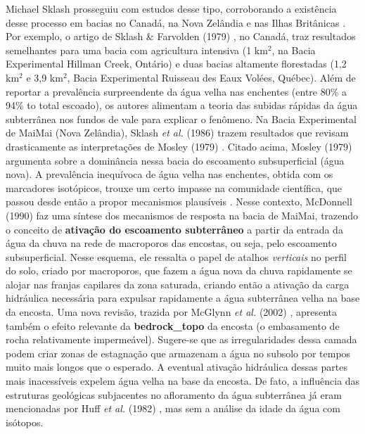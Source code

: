 \documentclass[./main.tex]{subfiles}
\begin{document}
\noindent Michael Sklash prosseguiu com estudos desse tipo, corroborando a existência desse processo em bacias no Canadá, na Nova Zelândia e nas Ilhas Britânicas \cite{sklash1979, sklash1986, sklash1996}. Por exemplo, o artigo de Sklash \& Farvolden (1979) \cite{sklash1979}, no Canadá, traz resultados semelhantes para uma bacia com agricultura intensiva (1 km$^2$, na Bacia Experimental Hillman Creek, Ontário) e duas bacias altamente florestadas (1,2 km$^2$ e 3,9 km$^2$, Bacia Experimental Ruisseau des Eaux Volées, Québec). Além de reportar a prevalência surpreendente da água velha nas enchentes (entre 80\% a 94\% to total escoado), os autores alimentam a teoria das subidas rápidas da água subterrânea nos fundos de vale para explicar o fenômeno. Na Bacia Experimental de MaiMai (Nova Zelândia), Sklash \textit{et al.} (1986) \cite{sklash1986} trazem resultados que revisam drasticamente as interpretações de Mosley (1979) \cite{Mosley1979}. Citado acima, Mosley (1979) argumenta sobre a dominância nessa bacia do escoamento subsuperficial (água nova). A prevalência inequívoca de água velha nas enchentes, obtida com os marcadores isotópicos, trouxe um certo impasse na comunidade científica, que passou desde então a propor mecanismos plausíveis \cite{buttle1994}. Nesse contexto, McDonnell (1990) \cite{mcdonnell1990} faz uma síntese dos mecanismos de resposta na bacia de MaiMai, trazendo o conceito de \textbf{ativação do escoamento subterrâneo} a partir da entrada da água da chuva na rede de macroporos das encostas, ou seja, pelo escoamento subsuperficial. Nesse esquema, ele ressalta o papel de atalhos \textit{verticais} no perfil do solo, criado por macroporos, que fazem a água nova da chuva rapidamente se alojar nas franjas capilares da zona saturada, criando então a ativação da carga hidráulica necessária para expulsar rapidamente a água subterrânea velha na base da encosta. Uma nova revisão, trazida por McGlynn \textit{et al.} (2002) \cite{mcglynn2002}, apresenta também o efeito relevante da \textbf{\gls{bedrock_topo}} da encosta (o embasamento de rocha relativamente impermeável). Sugere-se que as irregularidades dessa camada podem criar zonas de estagnação que armazenam a água no subsolo por tempos muito mais longos que o esperado. A eventual ativação hidráulica dessas partes mais inacessíveis expelem água velha na base da encosta. De fato, a influência das estruturas geológicas subjacentes no afloramento da água subterrânea já eram mencionadas por Huff \textit{et al.} (1982) \cite{Huff1982}, mas sem a análise da idade da água com isótopos.
\end{document}
